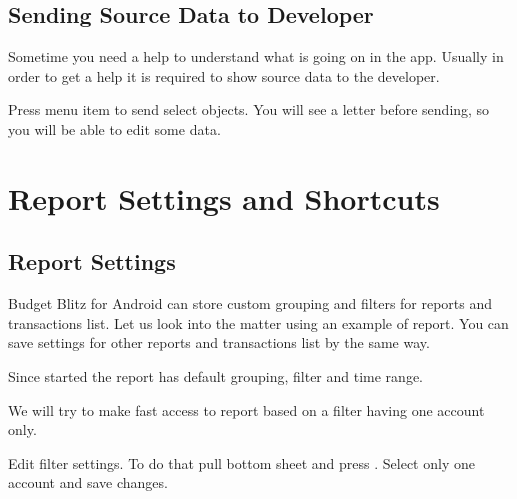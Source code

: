 \documentclass[a4paper,10pt,english]{sphinxmanual}
\begin{document}
\section{Sending Source Data to Developer}
\label{\detokenize{bulk-actions:sending-source-data-to-developer}}
\sphinxAtStartPar
Sometime you need a help to understand what is going on in the app. Usually in
order to get a help it is required to show source data to the developer.

\sphinxAtStartPar
Press  menu item to send select objects. You will
see a letter before sending, so you will be able to edit some data.

\noindent{}
\noindent{}

\sphinxstepscope


\chapter{Report Settings and Shortcuts}
\label{\detokenize{shortcuts:report-settings-and-shortcuts}}\label{\detokenize{shortcuts:chapter-shortcuts}}\label{\detokenize{shortcuts::doc}}

\section{Report Settings}
\label{\detokenize{shortcuts:report-settings}}
\sphinxAtStartPar
Budget Blitz for Android can store custom grouping and filters for reports and transactions list. Let us
look into the matter using an example of  report. You can save
settings for other reports and transactions list by the same way.

\sphinxAtStartPar
Since started the report has default grouping, filter and time range.

\noindent{}
\noindent{}
\noindent{}

\sphinxAtStartPar
We will try to make fast access to  report based on a filter having one account only.

\sphinxAtStartPar
Edit filter settings. To do that pull bottom sheet and press . Select only one account
and save changes.
\end{document}
